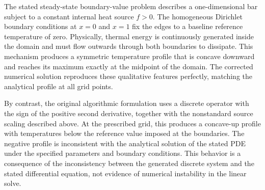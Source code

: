 The stated steady-state boundary-value problem describes a one-dimensional bar subject to a constant internal heat source $f > 0$. The homogeneous Dirichlet boundary conditions at $x=0$ and $x=1$ fix the edges to a baseline reference temperature of zero. Physically, thermal energy is continuously generated inside the domain and must flow outwards through both boundaries to dissipate. This mechanism produces a symmetric temperature profile that is concave downward and reaches its maximum exactly at the midpoint of the domain. The corrected numerical solution reproduces these qualitative features perfectly, matching the analytical profile at all grid points.

By contrast, the original algorithmic formulation uses a discrete operator with the sign of the positive second derivative, together with the nonstandard source scaling described above. At the prescribed grid, this produces a concave-up profile with temperatures below the reference value imposed at the boundaries. The negative profile is inconsistent with the analytical solution of the stated PDE under the specified parameters and boundary conditions. This behavior is a consequence of the inconsistency between the generated discrete system and the stated differential equation, not evidence of numerical instability in the linear solve.
